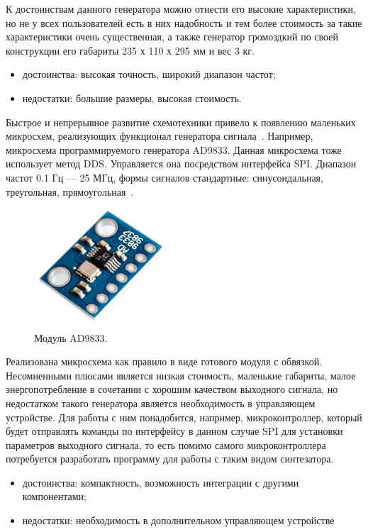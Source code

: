 	К достоинствам данного генератора можно отнести его высокие характеристики, но не у всех пользователей есть в них надобность и тем более стоимость за такие характеристики очень существенная, а также генератор громоздкий по своей конструкции его габариты 235 х 110 х 295 мм и вес 3 кг. 	
	
	\begin{itemize}
	\item достоинства: высокая точность, широкий диапазон частот;
	\item недостатки: большие размеры, высокая стоимость.
	\end{itemize}
	
	Быстрое и непрерывное развитие схемотехники привело к появлению маленьких микросхем, реализующих функционал генератора сигнала~\cite{syntdds}. Например, микросхема программируемого генератора AD9833. Данная микросхема тоже использует метод DDS. Управляется она посредством интерфейса SPI. Диапазон частот 0.1 Гц --- 25 МГц, формы сигналов стандартные: синусоидальная, треугольная, прямоугольная~\cite{ad9833}.

	\begin{figure}[H]
    \centering
    \includegraphics[width=0.45\textwidth]{../image/ad9833.png}
    \caption{Модуль AD9833.}
	\end{figure}	
	
	Реализована микросхема как правило в виде готового модуля с обвязкой. Несомненными плюсами является низкая стоимость, маленькие габариты, малое энергопотребление в сочетании с хорошим качеством выходного сигнала, но недостатком такого генератора является необходимость в управляющем устройстве. Для работы с ним понадобится, например, микроконтроллер, который будет отправлять команды по интерфейсу в данном случае SPI для установки параметров выходного сигнала, то есть помимо самого микроконтроллера потребуется разработать программу для работы с таким видом синтезатора.
	
	\begin{itemize}
	\item достоинства: компактность, возможность интеграции с другими компонентами;
	\item недостатки: необходимость в дополнительном управляющем устройстве
	\end{itemize}
	
